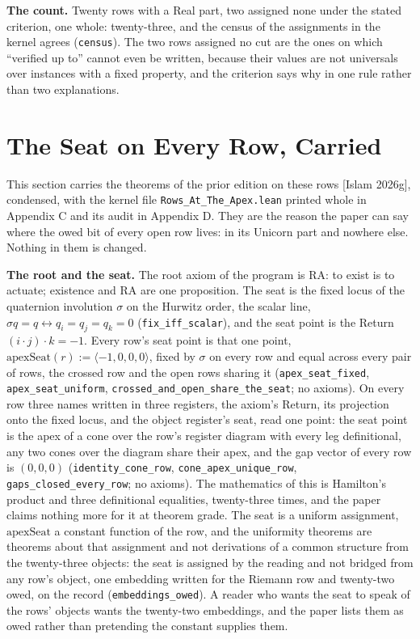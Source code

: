 \documentclass[10pt]{article}
\begin{document}
\textbf{The count.} Twenty rows with a Real part, two assigned none
under the stated criterion, one whole: twenty-three, and the census of
the assignments in the kernel agrees (\texttt{census}). The two rows
assigned no cut are the ones on which ``verified up to'' cannot even be
written, because their values are not universals over instances with a
fixed property, and the criterion says why in one rule rather than two
explanations.

\hypertarget{the-seat-on-every-row-carried}{%
\section{The Seat on Every Row,
Carried}\label{the-seat-on-every-row-carried}}

This section carries the theorems of the prior edition on these rows
{[}Islam 2026g{]}, condensed, with the kernel file
\texttt{Rows\_At\_The\_Apex.lean} printed whole in Appendix C and its
audit in Appendix D. They are the reason the paper can say where the
owed bit of every open row lives: in its Unicorn part and nowhere else.
Nothing in them is changed.

\textbf{The root and the seat.} The root axiom of the program is
\(\mathrm{RA}\): to exist is to actuate; existence and \(\mathrm{RA}\)
are one proposition. The seat is the fixed locus of the quaternion
involution \(\sigma\) on the Hurwitz order, the scalar line,
\(\sigma q = q \leftrightarrow q_i = q_j = q_k = 0\)
(\texttt{fix\_iff\_scalar}), and the seat point is the Return
\((i \cdot j)\cdot k = -1\). Every row's seat point is that one point,
\(\mathrm{apexSeat}(r) := \langle -1, 0, 0, 0\rangle\), fixed by
\(\sigma\) on every row and equal across every pair of rows, the crossed
row and the open rows sharing it (\texttt{apex\_seat\_fixed},
\texttt{apex\_seat\_uniform},
\texttt{crossed\_and\_open\_share\_the\_seat}; no axioms). On every row
three names written in three registers, the axiom's Return, its
projection onto the fixed locus, and the object register's seat, read
one point: the seat point is the apex of a cone over the row's register
diagram with every leg definitional, any two cones over the diagram
share their apex, and the gap vector of every row is \((0, 0, 0)\)
(\texttt{identity\_cone\_row}, \texttt{cone\_apex\_unique\_row},
\texttt{gaps\_closed\_every\_row}; no axioms). The mathematics of this
is Hamilton's product and three definitional equalities, twenty-three
times, and the paper claims nothing more for it at theorem grade. The
seat is a uniform assignment, \(\mathrm{apexSeat}\) a constant function
of the row, and the uniformity theorems are theorems about that
assignment and not derivations of a common structure from the
twenty-three objects: the seat is assigned by the reading and not
bridged from any row's object, one embedding written for the Riemann row
and twenty-two owed, on the record (\texttt{embeddings\_owed}). A reader
who wants the seat to speak of the rows' objects wants the twenty-two
embeddings, and the paper lists them as owed rather than pretending the
constant supplies them.
\end{document}
